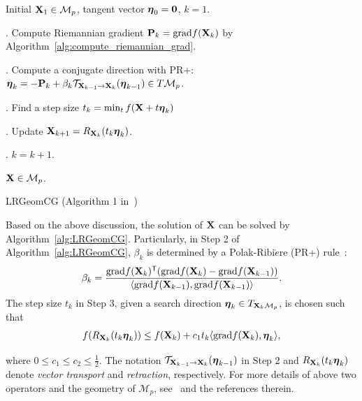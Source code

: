 \documentclass[10pt,twocolumn,letterpaper]{article}
\newcommand\mycomment[1]{}
\def\ranksym{p}
\def\M{\mathcal{M}}
\def\trsp{{\sf T}}
\def\0{{\bf 0}}
\def\grad{{\text{grad}}}
\def\bfeta{\mbox{{\boldmath $\eta$}}}
\def\mT{{\mathcal T}}
\def\bX{{\bf X}}
\def\bX{{\bf X}}
\def\bP{{\bf P}}
\begin{document}
\begin{algorithm}
  \begin{algorithmic}
    \REQUIRE Initial $\bX_{1} \in \M_{\ranksym}$, tangent vector $\bfeta_{0} = \0$, $k = 1$.


      . Compute Riemannian gradient $\bP_{k} = \grad f(\bX_{k})$ by Algorithm~\ref{alg:compute_riemannian_grad}.

      . Compute a conjugate direction with PR+:
             $\bfeta_k = - \bP_{k} + \beta_{k} \mT_{\bX_{k-1} \rightarrow \bX_{k}}( \bfeta_{k-1}) \in T\M_{\ranksym}$.

      . Find a step size $t_{k} = \min_{t} f(\bX + t\bfeta_{k}) $

      . Update $\bX_{k+1} = R_{\bX_{k}}(t_{k} \bfeta_{k})$.

      . $k = k + 1$.

    \ENDWHILE

    \ENSURE $\bX \in \M_{\ranksym}$.

  \end{algorithmic}
  \caption{LRGeomCG (Algorithm 1 in~\cite{vandereycken2013lowrank})}
  \label{alg:LRGeomCG}
\end{algorithm}


Based on the above discussion, the solution of $\bX$ can be solved by Algorithm~\ref{alg:LRGeomCG}.
Particularly, in Step 2 of Algorithm~\ref{alg:LRGeomCG}, $\beta_{k}$ is determined by a Polak-Ribi$\grave{e}$re (PR+) rule~\cite{vandereycken2013lowrank}:
{
\begin{eqnarray}\label{eq:beta}
\beta_{k} = \frac{\grad f(\bX_{k})^{\trsp}(\grad f(\bX_{k}) - \grad f(\bX_{k-1}))}{\langle \grad f(\bX_{k-1}),\grad f(\bX_{k-1})\rangle}.
\end{eqnarray}
}
\noindent
The step size $t_{k}$ in Step 3, given a search direction $\bfeta_{k} \in T_{\bX_{k} \M_{\ranksym}}$, is chosen such that
{
\begin{align}\label{eq:choose_step_size}
  f(R_{\bX_{k}} (t_{k} \bfeta_{k})) \leq f(\bX_{k}) + c_{1} t_{k} \langle \grad f(\bX_{k}), \bfeta_{k} \rangle ,
\end{align}
}
\mycomment{
{
\begin{align}\label{eq+choose_step_size2}
  | \langle \grad f(R_{\bX_{k}} (t_{k} \bfeta_{k})), & \mT_{\bX_{k-1} \rightarrow \bX_{k}} (\bfeta_{k}) \rangle |  \nonumber \\
                           & \leq c_{2} | \langle \grad f(\bX_{k}), \bfeta_{k} \rangle |  ,
\end{align}
}
}
\noindent
where $0 \leq c_{1} \leq c_{2} \leq \frac{1}{2}$.
The notation $\mT_{\bX_{k-1} \rightarrow \bX_{k}} (\bfeta_{k-1})$ in Step 2 and $R_{\bX_{k}} (t_k \bfeta_{k})$ denote \emph{vector transport} and \emph{retraction}, respectively.
For more details of above two operators and the geometry of $\M_{\ranksym}$, see~\cite{vandereycken2013lowrank} and the references therein.
\end{document}
